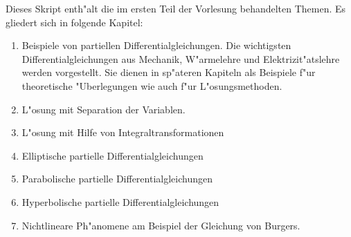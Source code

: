 Dieses Skript enth"alt die im ersten Teil der Vorlesung behandelten 
Themen. Es gliedert sich in folgende Kapitel:
\begin{enumerate}
\item Beispiele von partiellen Differentialgleichungen. Die wichtigsten
Differentialgleichungen aus Mechanik, W"armelehre und Elektrizit"atslehre
werden vorgestellt. Sie dienen in sp"ateren Kapiteln als Beispiele
f"ur theoretische "Uberlegungen wie auch f"ur L"osungsmethoden.
\item L"osung mit Separation der Variablen.
\item L"osung mit Hilfe von Integraltransformationen
\item Elliptische partielle Differentialgleichungen
\item Parabolische partielle Differentialgleichungen
\item Hyperbolische partielle Differentialgleichungen
\item Nichtlineare Ph"anomene am Beispiel der Gleichung von Burgers.
\end{enumerate}


